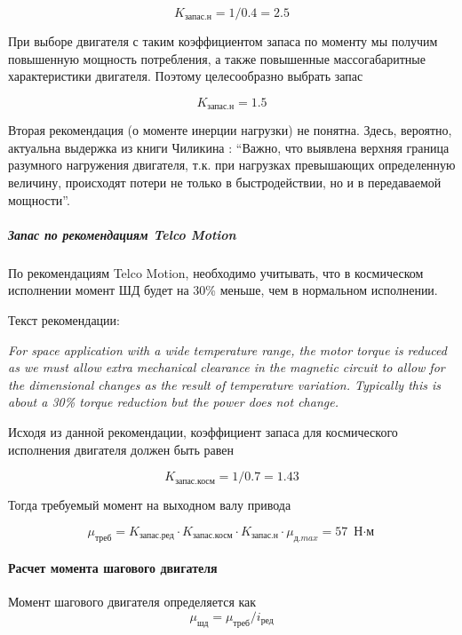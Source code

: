 $$
    K_\textit{запас.н} = 1 / 0.4 = 2.5
$$

При выборе двигателя с таким коэффициентом запаса по моменту мы получим повышенную
мощность потребления, а также повышенные массогабаритные характеристики двигателя.
Поэтому целесообразно выбрать запас

$$
    K_\textit{запас.н} = 1.5
$$

Вторая рекомендация (о моменте инерции нагрузки) не понятна. Здесь, вероятно,
актуальна выдержка из книги Чиликина \cite{Chilikin}: ``Важно, что выявлена верхняя
граница разумного нагружения двигателя, т.к. при нагрузках превышающих определенную
величину, происходят потери не только в быстродействии, но и в передаваемой мощности''.

\subparagraph{Запас по рекомендациям \foreignlanguage{english}{Telco Motion}}
По рекомендациям \foreignlanguage{english}{Telco Motion}, необходимо учитывать, что в космическом исполнении
момент ШД будет на 30\% меньше, чем в нормальном исполнении.

Текст рекомендации:
\begin{otherlanguage}{english}
    \textit{For space application with a wide temperature range, the motor torque is reduced
    as we must allow extra mechanical clearance in the magnetic circuit to allow for
    the dimensional changes as the result of temperature variation. Typically this
    is about a 30\% torque reduction but the power does not change.}
\end{otherlanguage}

Исходя из данной рекомендации, коэффициент запаса для космического исполнения
двигателя должен быть равен

$$
    K_\textit{запас.косм} = 1 / 0.7 = 1.43
$$

Тогда требуемый момент на выходном валу привода

$$
    \mu_\textit{треб} =
                K_\textit{запас.ред} \cdot K_\textit{запас.косм}
                \cdot K_\textit{запас.н} \cdot \mu_\textit{д.max}
                = 57 \text{ Н$\cdot$м}
$$

\paragraph{Расчет момента шагового двигателя}

Момент шагового двигателя определяется как
\begin{equation}
    \mu_\textit{шд} = \mu_\textit{треб} / i_\text{ред}
    \label{stepper_engine_torque}
\end{equation}


